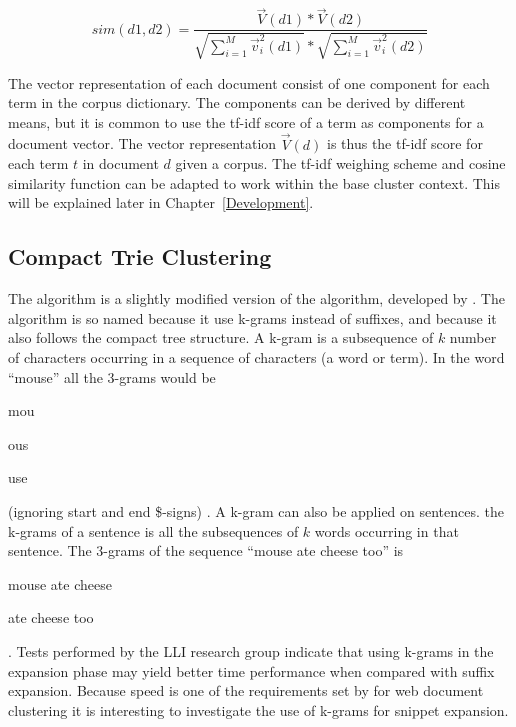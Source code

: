 \begin{displaymath}
sim(d1, d2) = \frac{\vec{V}(d1) * \vec{V}(d2)}
{\sqrt{\sum_{i = 1}^M\vec{v}_{i}^2(d1)} * \sqrt{\sum_{i = 1}^M\vec{v}_{i}^2(d2)}}
\end{displaymath}

The vector representation of each document consist of one component for each term in the corpus dictionary. The components can be derived by different means, but it is common to use the tf-idf score of a term as components for a document vector. The vector representation \(\vec{V}(d)\) is thus the tf-idf score for each term \(t\) in document \(d\) given a corpus. The tf-idf weighing scheme and cosine similarity function can be adapted to work within the base cluster context. This will be explained later in Chapter~\ref{Development}.

\subsection{Compact Trie Clustering}
The \CTC algorithm is a slightly modified version of the \STC algorithm, developed by \supervisor. The algorithm is so named because it use k-grams instead of suffixes, and because it also follows the compact tree structure. A k-gram is a subsequence of \(k\) number of characters occurring in a sequence of characters (a word or term). In the word ``mouse'' all the 3-grams would be 
\begin{inparaenum}[(1)] 
    \item mou
    \item ous
    \item use
\end{inparaenum}
(ignoring start and end \$-signs)
\cite{Manning2009}. A k-gram can also be applied on sentences. the k-grams of a sentence is all the subsequences of \(k\) words occurring in that sentence. The 3-grams of the sequence ``mouse ate cheese too'' is
\begin{inparaenum}[(1)] 
    \item mouse ate cheese
    \item ate cheese too
\end{inparaenum}.
Tests performed by the LLI research group indicate that using k-grams in the expansion phase may yield better time performance when compared with suffix expansion. Because speed is one of the requirements set by \cite{Oren1998} for web document clustering it is interesting to investigate the use of k-grams for snippet expansion.

